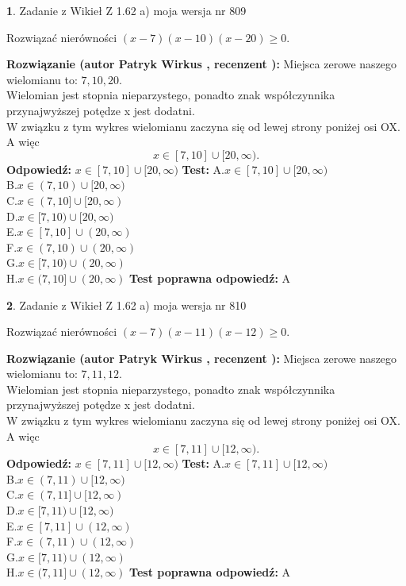 \documentclass[12pt, a4paper]{article}
\theoremstyle{definition} %
\newtheorem{zad}{}
\newcommand{\zadStart}[1]{\begin{zad}#1\newline}
\newcommand{\zadStop}{\end{zad}}
\newcommand{\rozwStart}[2]{\noindent \textbf{Rozwiązanie (autor #1 , recenzent #2): }\newline}
\newcommand{\rozwStop}{\newline}
\newcommand{\odpStart}{\noindent \textbf{Odpowiedź:}\newline}
\newcommand{\odpStop}{\newline}
\newcommand{\testStart}{\noindent \textbf{Test:}\newline}
\newcommand{\testStop}{\newline}
\newcommand{\kluczStart}{\noindent \textbf{Test poprawna odpowiedź:}\newline}
\newcommand{\kluczStop}{\newline}
\begin{document}
\zadStart{Zadanie z Wikieł Z 1.62 a) moja wersja nr 809}

Rozwiązać nierówności $(x-7)(x-10)(x-20)\ge0$.
\zadStop
\rozwStart{Patryk Wirkus}{}
Miejsca zerowe naszego wielomianu to: $7, 10, 20$.\\
Wielomian jest stopnia nieparzystego, ponadto znak współczynnika przy\linebreak najwyższej potędze x jest dodatni.\\ W związku z tym wykres wielomianu zaczyna się od lewej strony poniżej osi OX. A więc $$x \in [7,10] \cup [20,\infty).$$
\rozwStop
\odpStart
$x \in [7,10] \cup [20,\infty)$
\odpStop
\testStart
A.$x \in [7,10] \cup [20,\infty)$\\
B.$x \in (7,10) \cup [20,\infty)$\\
C.$x \in (7,10] \cup [20,\infty)$\\
D.$x \in [7,10) \cup [20,\infty)$\\
E.$x \in [7,10] \cup (20,\infty)$\\
F.$x \in (7,10) \cup (20,\infty)$\\
G.$x \in [7,10) \cup (20,\infty)$\\
H.$x \in (7,10] \cup (20,\infty)$
\testStop
\kluczStart
A
\kluczStop



\zadStart{Zadanie z Wikieł Z 1.62 a) moja wersja nr 810}

Rozwiązać nierówności $(x-7)(x-11)(x-12)\ge0$.
\zadStop
\rozwStart{Patryk Wirkus}{}
Miejsca zerowe naszego wielomianu to: $7, 11, 12$.\\
Wielomian jest stopnia nieparzystego, ponadto znak współczynnika przy\linebreak najwyższej potędze x jest dodatni.\\ W związku z tym wykres wielomianu zaczyna się od lewej strony poniżej osi OX. A więc $$x \in [7,11] \cup [12,\infty).$$
\rozwStop
\odpStart
$x \in [7,11] \cup [12,\infty)$
\odpStop
\testStart
A.$x \in [7,11] \cup [12,\infty)$\\
B.$x \in (7,11) \cup [12,\infty)$\\
C.$x \in (7,11] \cup [12,\infty)$\\
D.$x \in [7,11) \cup [12,\infty)$\\
E.$x \in [7,11] \cup (12,\infty)$\\
F.$x \in (7,11) \cup (12,\infty)$\\
G.$x \in [7,11) \cup (12,\infty)$\\
H.$x \in (7,11] \cup (12,\infty)$
\testStop
\kluczStart
A
\kluczStop
\end{document}
